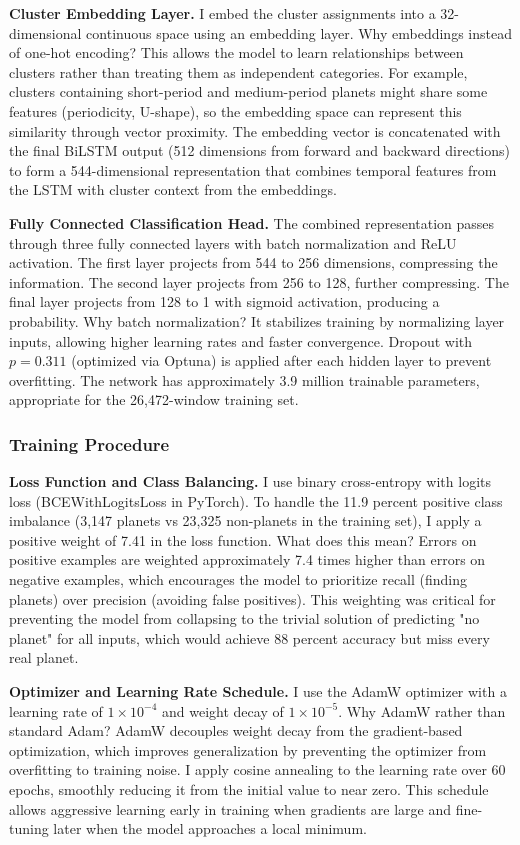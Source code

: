 \documentclass[letterpaper]{article} %
\begin{document}
\textbf{Cluster Embedding Layer.} I embed the cluster assignments into a 32-dimensional continuous space using an embedding layer. Why embeddings instead of one-hot encoding? This allows the model to learn relationships between clusters rather than treating them as independent categories. For example, clusters containing short-period and medium-period planets might share some features (periodicity, U-shape), so the embedding space can represent this similarity through vector proximity. The embedding vector is concatenated with the final BiLSTM output (512 dimensions from forward and backward directions) to form a 544-dimensional representation that combines temporal features from the LSTM with cluster context from the embeddings.

\textbf{Fully Connected Classification Head.} The combined representation passes through three fully connected layers with batch normalization and ReLU activation. The first layer projects from 544 to 256 dimensions, compressing the information. The second layer projects from 256 to 128, further compressing. The final layer projects from 128 to 1 with sigmoid activation, producing a probability. Why batch normalization? It stabilizes training by normalizing layer inputs, allowing higher learning rates and faster convergence. Dropout with $p=0.311$ (optimized via Optuna) is applied after each hidden layer to prevent overfitting. The network has approximately 3.9 million trainable parameters, appropriate for the 26,472-window training set.

\subsubsection{Training Procedure}

\textbf{Loss Function and Class Balancing.} I use binary cross-entropy with logits loss (BCEWithLogitsLoss in PyTorch). To handle the 11.9 percent positive class imbalance (3,147 planets vs 23,325 non-planets in the training set), I apply a positive weight of 7.41 in the loss function. What does this mean? Errors on positive examples are weighted approximately 7.4 times higher than errors on negative examples, which encourages the model to prioritize recall (finding planets) over precision (avoiding false positives). This weighting was critical for preventing the model from collapsing to the trivial solution of predicting "no planet" for all inputs, which would achieve 88 percent accuracy but miss every real planet.

\textbf{Optimizer and Learning Rate Schedule.} I use the AdamW optimizer with a learning rate of $1 \times 10^{-4}$ and weight decay of $1 \times 10^{-5}$. Why AdamW rather than standard Adam? AdamW decouples weight decay from the gradient-based optimization, which improves generalization by preventing the optimizer from overfitting to training noise. I apply cosine annealing to the learning rate over 60 epochs, smoothly reducing it from the initial value to near zero. This schedule allows aggressive learning early in training when gradients are large and fine-tuning later when the model approaches a local minimum.
\end{document}
